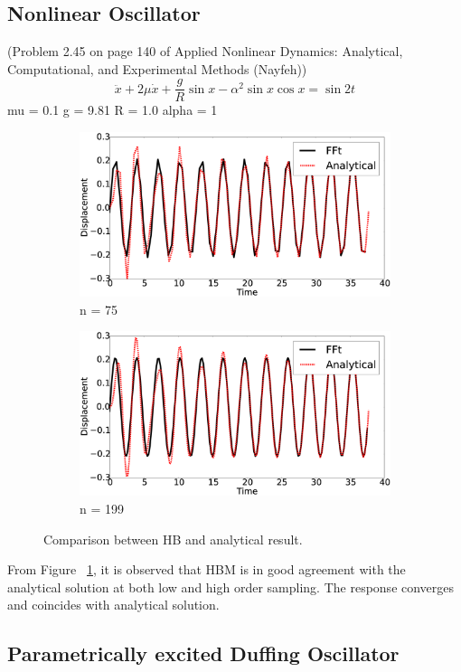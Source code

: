 \documentclass[12pt, a4paper]{extarticle}
\begin{document}
\subsection{Nonlinear Oscillator}
(Problem 2.45 on page 140 of Applied Nonlinear Dynamics: Analytical, Computational, and Experimental Methods (Nayfeh))
\begin{equation}
	\ddot{x} + 2 \mu \dot{x} + \frac{g}{R} \sin x - \alpha^2 \sin x \cos x = \sin 2t
\end{equation}
mu = 0.1
g = 9.81
R = 1.0
alpha = 1
\begin{figure}[H]
	\centering
	\begin{subfigure}[h]{8.0 cm}
		\includegraphics[width=8.0 cm]{figure/2N75.eps}
		\caption{n = 75}
	\end{subfigure}
	\begin{subfigure}[h]{8.0 cm}
        \includegraphics[width=8.0 cm]{figure/2N199.eps}
		\caption{n = 199}
    \end{subfigure}
    \caption{Comparison between HB and analytical result.}
    \label{fig:R1}
\end{figure}
{From Figure ~\ref{fig:R1}, it is observed that HBM is in good agreement with the analytical solution at both low and high order sampling. The response converges and coincides with analytical solution.}

\subsection{Parametrically excited Duffing Oscillator}
\end{document}
